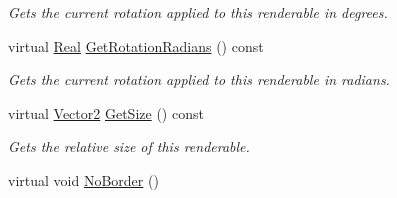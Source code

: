 \begin{DoxyCompactItemize}
\begin{DoxyCompactList}\small\item\em Gets the current rotation applied to this renderable in degrees. \item\end{DoxyCompactList}\item 
virtual \hyperlink{namespaceMezzanine_a726731b1a7df72bf3583e4a97282c6f6}{Real} \hyperlink{classMezzanine_1_1UI_1_1Rectangle_af7628218ad7b2a1b12d75d578849261e}{GetRotationRadians} () const 
\begin{DoxyCompactList}\small\item\em Gets the current rotation applied to this renderable in radians. \item\end{DoxyCompactList}\item 
virtual \hyperlink{classMezzanine_1_1Vector2}{Vector2} \hyperlink{classMezzanine_1_1UI_1_1Rectangle_a2deccb0b2e08116b01941afdd4eb7475}{GetSize} () const 
\begin{DoxyCompactList}\small\item\em Gets the relative size of this renderable. \item\end{DoxyCompactList}\item 
\hypertarget{classMezzanine_1_1UI_1_1Rectangle_ac6940d920a491fde80b9df599fab9daa}{
virtual void \hyperlink{classMezzanine_1_1UI_1_1Rectangle_ac6940d920a491fde80b9df599fab9daa}{NoBorder} ()}
\label{classMezzanine_1_1UI_1_1Rectangle_ac6940d920a491fde80b9df599fab9daa}


\end{DoxyCompactItemize}
